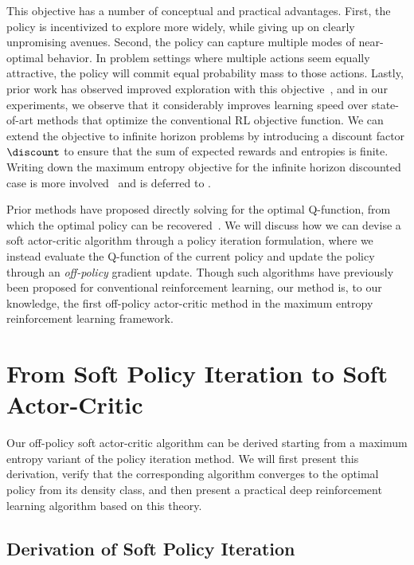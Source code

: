 \documentclass{article}
\begin{document}
This objective has a number of conceptual and practical advantages. First, the policy is incentivized to explore more widely, while giving up on clearly unpromising avenues. Second, the policy can capture multiple modes of near-optimal behavior. In problem settings where multiple actions seem equally attractive, the policy will commit equal probability mass to those actions.
Lastly, prior work has observed improved exploration with this objective~\citep{haarnoja2017reinforcement,schulman2017equivalence}, and in our experiments, we observe that it considerably improves learning speed over state-of-art methods that optimize the conventional RL objective function. We can extend the objective to infinite horizon problems by introducing a discount factor $\discount$ to ensure that the sum of expected rewards and entropies is finite. Writing down the maximum entropy objective for the infinite horizon discounted case is more involved~\citep{thomas2014bias} and is deferred to .

Prior methods have proposed directly solving for the optimal Q-function, from which the optimal policy can be recovered~\citep{ziebart2008maximum,fox2015taming,haarnoja2017reinforcement}. We will discuss how we can devise a soft actor-critic algorithm through a policy iteration formulation, where we instead evaluate the Q-function of the current policy and update the policy through an \emph{off-policy} gradient update. Though such algorithms have previously been proposed for conventional reinforcement learning, our method is, to our knowledge, the first off-policy actor-critic method in the maximum entropy reinforcement learning framework.
%

\section{From Soft Policy Iteration to Soft Actor-Critic} 
\label{sec:soft_policy_iteration}

Our off-policy soft actor-critic algorithm can be derived starting from a maximum entropy variant of the policy iteration method. We will first present this derivation, verify that the corresponding algorithm converges to the optimal policy from its density class, and then present a practical deep reinforcement learning algorithm based on this theory.

\subsection{Derivation of Soft Policy Iteration}
\end{document}
